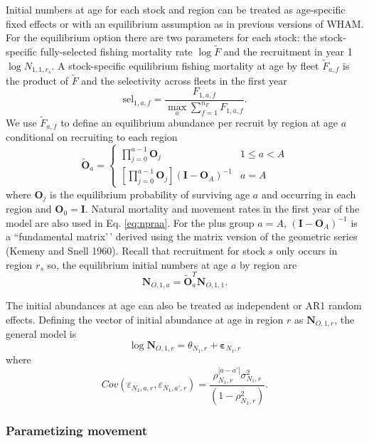 \documentclass[
]{article}
\begin{document}
Initial numbers at age for each stock and region can be treated as age-specific fixed effects or with an equilibrium assumption as in previous versions of WHAM. For the equilibrium option there are two parameters for each stock: the stock-specific fully-selected fishing mortality rate \(\log \widetilde{F}\) and the recruitment in year 1 \(\log N_{1,1,r_s}\). A stock-specific equilibrium fishing mortality at age by fleet \({\tilde F}_{a,f}\) is the product of \(\widetilde{F}\) and the selectivity across fleets in the first year
\begin{equation*}
  \text{sel}_{1,a,f} = \frac{F_{1,a,f}}{\max_a \sum_{f=1}^{n_F} F_{1,a,f}}.
\end{equation*}
We use \(\widetilde{F}_{a,f}\) to define an equilibrium abundance per recruit by region at age \(a\) conditional on recruiting to each region
\begin{equation}\label{eq:npraa}
 \widetilde{\mathbf{O}}_{a} = \left\{
 \begin{array}{ll}
\prod^{a-1}_{j=0}\mathbf{O}_{j}  & 1\leq a<A\\
\left[\prod^{a-1}_{j=0}\mathbf{O}_{j}\right] \left(\mathbf{I} - \mathbf{O}_{A}\right)^{-1} & a = A
 \end{array}
\right.
\end{equation}
where \(\mathbf{O}_{j}\) is the equilibrium probability of surviving age \(a\) and occurring in each region and \(\mathbf{O}_{0} = \mathbf{I}\). Natural mortality and movement rates in the first year of the model are also used in Eq. \ref{eq:npraa}. For the plus group \(a=A\), \(\left(\mathbf{I} - \mathbf{O}_{A}\right)^{-1}\) is a ``fundamental matrix'\,' derived using the matrix version of the geometric series (Kemeny and Snell 1960). Recall that recruitment for stock \(s\) only occurs in region \(r_s\) so, the equilibrium initial numbers at age \(a\) by region are
\[\mathbf{N}_{O,1,a} = \widetilde{\mathbf{O}}_{a}^T \mathbf{N}_{O,1,1}.\]

The initial abundances at age can also be treated as independent or AR1 random effects. Defining the vector of initial abundance at age in region \(r\) as \(\mathbf{N}_{O,1,r}\), the general model is
\[\log \mathbf{N}_{O,1,r} = \theta_{N_1,r} + \boldsymbol{\varepsilon}_{N_1,r}\]
where
\[  Cov\left(\varepsilon_{N_1,a,r},\varepsilon_{N_1,a',r}\right) = \frac{\rho_{N_1,r}^{|a-a'|}\sigma^2_{N_1,r}} {\left(1-\rho_{N_1,r}^2\right)}.\]

\hypertarget{parametizing-movement}{%
\subsubsection*{Parametizing movement}\label{parametizing-movement}}
\end{document}
